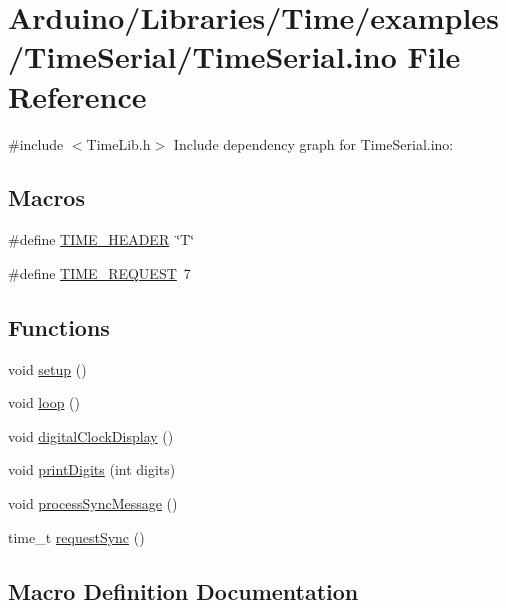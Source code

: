 \hypertarget{_time_serial_8ino}{}\section{Arduino/\+Libraries/\+Time/examples/\+Time\+Serial/\+Time\+Serial.ino File Reference}
\label{_time_serial_8ino}
{\ttfamily \#include $<$Time\+Lib.\+h$>$}\newline
Include dependency graph for Time\+Serial.\+ino\+:
\subsection*{Macros}
\begin{DoxyCompactItemize}
\item 
\#define \hyperlink{_time_serial_8ino_aa9f2cbf2a35ec653aff12241a63ca864}{T\+I\+M\+E\+\_\+\+H\+E\+A\+D\+ER}~\char`\"{}T\char`\"{}
\item 
\#define \hyperlink{_time_serial_8ino_a355248075031107c0438456dd7357b63}{T\+I\+M\+E\+\_\+\+R\+E\+Q\+U\+E\+ST}~7
\end{DoxyCompactItemize}
\subsection*{Functions}
\begin{DoxyCompactItemize}
\item 
void \hyperlink{_time_serial_8ino_a4fc01d736fe50cf5b977f755b675f11d}{setup} ()
\item 
void \hyperlink{_time_serial_8ino_afe461d27b9c48d5921c00d521181f12f}{loop} ()
\item 
void \hyperlink{_time_serial_8ino_a01f3a72442d58926459c48afce4746e7}{digital\+Clock\+Display} ()
\item 
void \hyperlink{_time_serial_8ino_a772afab0396032477ec7b01d14c774b2}{print\+Digits} (int digits)
\item 
void \hyperlink{_time_serial_8ino_a49f4bff50a6119cf44f9793a02ad634c}{process\+Sync\+Message} ()
\item 
time\+\_\+t \hyperlink{_time_serial_8ino_a0ec9458a3ed4ddac072047471be25b1b}{request\+Sync} ()
\end{DoxyCompactItemize}


\subsection{Macro Definition Documentation}
\mbox{\label{_time_serial_8ino_aa9f2cbf2a35ec653aff12241a63ca864}} 
